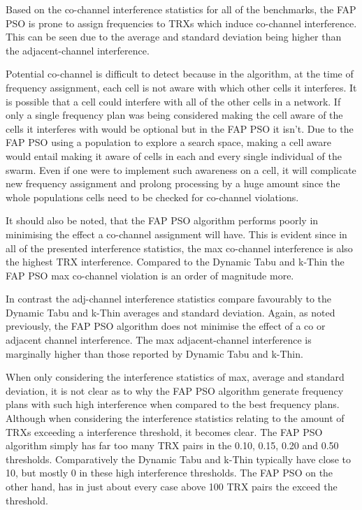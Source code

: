 Based on the co-channel interference statistics for all of the benchmarks, the FAP PSO is prone to assign frequencies to TRXs which induce co-channel interference. This can be seen due to the average and standard deviation being higher than the adjacent-channel interference.

Potential co-channel is difficult to detect because in the algorithm, at the time of frequency assignment, each cell is not aware with which other cells it interferes. It is possible that a cell could interfere with all of the other cells in a network. If only a single frequency plan was being considered making the cell aware of the cells it interferes with would be optional but in the FAP PSO it isn't. Due to the FAP PSO using a population to explore a search space, making a cell aware would entail making it aware of cells in each and every single individual of the swarm. Even if one were to implement such awareness on a cell, it will complicate new frequency assignment and prolong processing by a huge amount since the whole populations cells need to be checked for co-channel violations.

It should also be noted, that the FAP PSO algorithm performs poorly in minimising the effect a co-channel assignment will have. This is evident since in all of the presented interference statistics, the max co-channel interference is also the highest TRX interference. Compared to the Dynamic Tabu and k-Thin the FAP PSO max co-channel violation is an order of magnitude more.

In contrast the adj-channel interference statistics compare favourably to the Dynamic Tabu and k-Thin averages and standard deviation. Again, as noted previously, the FAP PSO algorithm does not minimise the effect of a co or adjacent channel interference. The max adjacent-channel interference is marginally higher than those reported by Dynamic Tabu and k-Thin.

When only considering the interference statistics of max, average and standard deviation, it is not clear as to why the FAP PSO algorithm generate frequency plans with such high interference when compared to the best frequency plans. Although when considering the interference statistics relating to the amount of TRXs exceeding a interference threshold, it becomes clear. The FAP PSO algorithm simply has far too many TRX pairs in the 0.10, 0.15, 0.20 and 0.50 thresholds. Comparatively the Dynamic Tabu and k-Thin typically have close to 10, but mostly 0 in these high interference thresholds. The FAP PSO on the other hand, has in just about every case above 100 TRX pairs the exceed the threshold.

